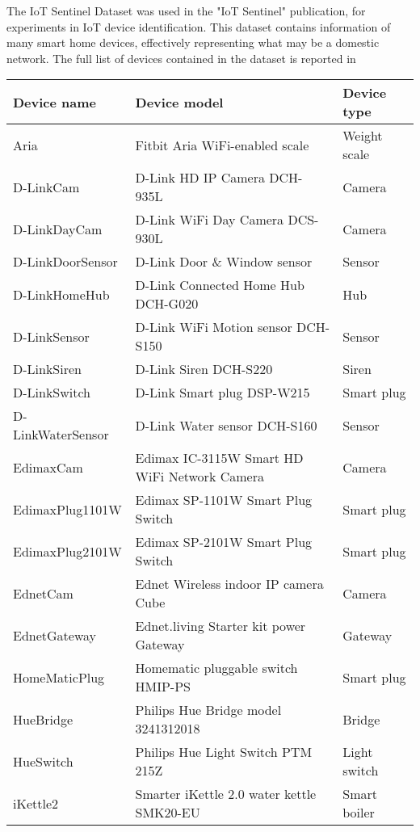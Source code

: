 The {IoT Sentinel Dataset}\cite{iot_site} was used in the "IoT Sentinel"\cite{iot_paper} publication, for experiments in IoT device identification. This dataset contains information of many smart home devices, effectively representing what may be a domestic network. The full list of devices contained in the dataset is reported in 


\begin{table}[H]
    \centering
    \begin{tabular}{l|l|l}
    \toprule
     Device name & Device model & Device type  \\
    \midrule
  Aria              & Fitbit Aria WiFi-enabled scale  &  Weight scale \\
  D-LinkCam         & D-Link HD IP Camera DCH-935L    &  Camera \\
  D-LinkDayCam      & D-Link WiFi Day Camera DCS-930L &  Camera \\
  D-LinkDoorSensor  & D-Link Door \& Window sensor     &  Sensor\\
  D-LinkHomeHub     &  D-Link Connected Home Hub DCH-G020 &  Hub  \\
  D-LinkSensor      & D-Link WiFi Motion sensor DCH-S150 &  Sensor \\
  D-LinkSiren       & D-Link Siren DCH-S220&  Siren \\
  D-LinkSwitch      & D-Link Smart plug DSP-W215  &  Smart plug \\
  D-LinkWaterSensor & D-Link Water sensor DCH-S160 &  Sensor \\
  EdimaxCam         & Edimax IC-3115W Smart HD WiFi Network Camera &  Camera \\
  EdimaxPlug1101W   & Edimax SP-1101W Smart Plug Switch  &  Smart plug \\
  EdimaxPlug2101W   & Edimax SP-2101W Smart Plug Switch&  Smart plug \\
  EdnetCam          & Ednet Wireless indoor IP camera Cube  &  Camera\\
  EdnetGateway      & Ednet.living Starter kit power Gateway & Gateway \\
  HomeMaticPlug     & Homematic pluggable switch HMIP-PS & Smart plug \\
  HueBridge         & Philips Hue Bridge model 3241312018 &  Bridge\\
  HueSwitch         & Philips Hue Light Switch PTM 215Z &  Light switch \\
  iKettle2          &  Smarter iKettle 2.0 water kettle SMK20-EU & Smart boiler \\

\end{tabular}
\end{table}
